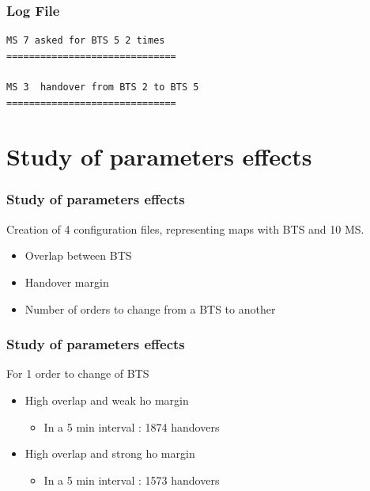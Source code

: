 \documentclass{beamer}
\begin{document}
\begin{frame}[fragile]
\frametitle{Log File}

{\tiny
\begin{verbatim}
MS 7 asked for BTS 5 2 times
==============================

MS 3  handover from BTS 2 to BTS 5
==============================

\end{verbatim}
}

\end{frame}

\section{Study of parameters effects}

\begin{frame}
\frametitle{Study of parameters effects}

Creation of 4 configuration files, representing maps with BTS and 10 MS.
\begin{itemize}
 \item Overlap between BTS
 \item Handover margin
 \item Number of orders to change from a BTS to another
\end{itemize}
\end{frame}

\begin{frame}
\frametitle{Study of parameters effects}

For 1 order to change of BTS
\begin{itemize}
 \item High overlap and weak ho margin
  \begin{itemize}
    \item In a 5 min interval : 1874 handovers
  \end{itemize}
 \item High overlap and strong ho margin
  \begin{itemize}
    \item In a 5 min interval : 1573 handovers
  \end{itemize}
\end{itemize}
\end{frame}
\end{document}
